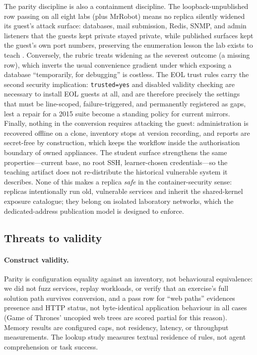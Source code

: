 \documentclass[3p,twocolumn,authoryear]{elsarticle}
\begin{document}
The parity discipline is also a containment discipline. The
loopback-unpublished row passing on all eight labs (plus MrRobot)
means no replica silently widened its guest's attack surface:
databases, mail submission, Redis, SNMP, and admin listeners that the
guests kept private stayed private, while published surfaces kept the
guest's own port numbers, preserving the enumeration lesson the lab
exists to teach \citep{thompson2018, yamin2020}. Conversely, the rubric
treats widening as the severest outcome (a missing row), which inverts
the usual convenience gradient under which exposing a database
``temporarily, for debugging'' is costless. The EOL trust rules carry
the second security implication: \texttt{trusted=yes} and disabled
validity checking are necessary to install EOL guests at all, and are
therefore precisely the settings that must be line-scoped,
failure-triggered, and permanently registered as gaps, lest a repair
for a 2015 suite become a standing policy for current mirrors. Finally,
nothing in the conversion requires attacking the guest: administration
is recovered offline on a clone, inventory stops at version recording,
and reports are secret-free by construction, which keeps the workflow
inside the authorisation boundary of owned appliances. The student
surface strengthens the same properties---current base, no root SSH,
learner-chosen credentials---so the teaching artifact does not
re-distribute the historical vulnerable system it describes. None of
this makes a replica \emph{safe} in the container-security sense:
replicas intentionally run old, vulnerable services and inherit the
shared-kernel exposure \citet{sultan2019} catalogue; they belong on
isolated laboratory networks, which the dedicated-address publication
model is designed to enforce.

\subsection{Threats to validity}

\paragraph{Construct validity.}
Parity is configuration equality against an inventory, not behavioural
equivalence: we did not fuzz services, replay workloads, or verify
that an exercise's full solution path survives conversion, and a
pass row for ``web paths'' evidences presence and HTTP status, not
byte-identical application behaviour in all cases (Game of Thrones'
uncopied web trees are scored partial for this reason). Memory results
are configured caps, not residency, latency, or throughput
measurements. The lookup study measures textual residence of rules,
not agent comprehension or task success.
\end{document}
